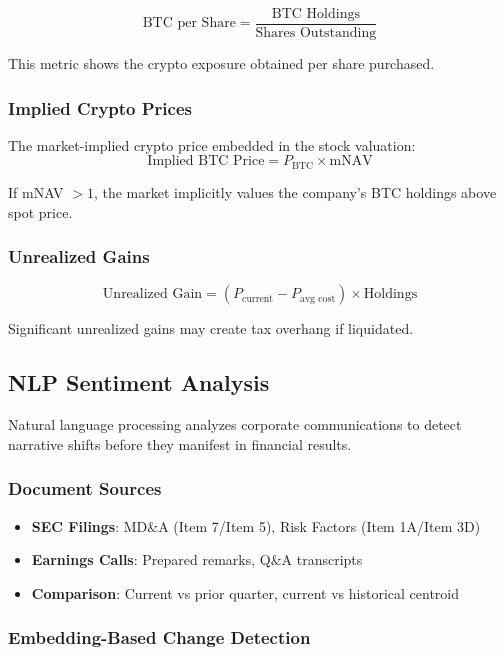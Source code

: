 \[
\text{BTC per Share} = \frac{\text{BTC Holdings}}{\text{Shares Outstanding}}
\]

This metric shows the crypto exposure obtained per share purchased.

\subsubsection{Implied Crypto Prices}

The market-implied crypto price embedded in the stock valuation:
\[
\text{Implied BTC Price} = P_{\text{BTC}} \times \text{mNAV}
\]

If mNAV $> 1$, the market implicitly values the company's BTC holdings above spot price.

\subsubsection{Unrealized Gains}

\[
\text{Unrealized Gain} = (P_{\text{current}} - P_{\text{avg cost}}) \times \text{Holdings}
\]

Significant unrealized gains may create tax overhang if liquidated.

\newpage\subsection{NLP Sentiment Analysis}

Natural language processing analyzes corporate communications to detect narrative shifts before they manifest in financial results.

\subsubsection{Document Sources}

\begin{itemize}
  \item \textbf{SEC Filings}: MD\&A (Item 7/Item 5), Risk Factors (Item 1A/Item 3D)
  \item \textbf{Earnings Calls}: Prepared remarks, Q\&A transcripts
  \item \textbf{Comparison}: Current vs prior quarter, current vs historical centroid
\end{itemize}

\subsubsection{Embedding-Based Change Detection}

